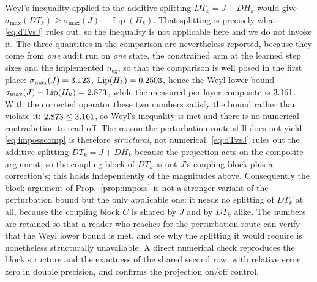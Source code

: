 \documentclass[journal,cmes,article,submit,moreauthors,pdftex]{Definitions/tsp}
\newcommand{\numv}[1]{#1}
\begin{document}
\begin{Remark}\label{rem:weyl}
Weyl's inequality applied to the additive splitting $DT_k=J+DH_k$ would give
$\sigma_{\max}(DT_k)\ge\sigma_{\max}(J)-\operatorname{Lip}(H_k)$. That splitting is precisely what
\eqref{eq:dTvsJ} rules out, so the inequality is not applicable here and we do not invoke it.
The three quantities in the comparison are nevertheless reported, because they come from
\emph{one} audit run on \emph{one} state, the constrained arm at
the learned step sizes and the implemented $n_{\mathrm{cg}}$, so that the comparison is well
posed in the first place:
$\sigma_{\max}(J)=\numv{\NumGdPhysSigma}$,
$\operatorname{Lip}(H_k)=\numv{\NumLipHCons}$, hence the Weyl lower bound
$\sigma_{\max}(J)-\operatorname{Lip}(H_k)=\numv{\NumWeylRhs}$, while the measured per-layer
composite is $\numv{\NumSigCompLayerCons}$. With the corrected operator these two numbers satisfy
the bound rather than violate it: $\numv{\NumWeylRhs}\le\numv{\NumSigCompLayerCons}$, so Weyl's
inequality is met and there is no numerical contradiction to read off. The reason the perturbation
route still does not yield \eqref{eq:imposscomp} is therefore \emph{structural}, not numerical:
\eqref{eq:dTvsJ} rules out the additive splitting $DT_k=J+DH_k$ because the projection acts on the
composite argument, so the coupling block of $DT_k$ is not $J$'s coupling block plus a correction's;
this holds independently of the magnitudes above. Consequently the block argument of
Prop.~\ref{prop:imposs} is not a stronger variant of the perturbation bound but the only
applicable one: it needs no splitting of $DT_k$ at all, because the coupling block $C$ is shared
by $J$ and by $DT_k$ alike. The numbers are retained so that a reader who reaches for the
perturbation route can verify that the Weyl lower bound is met, and see why the splitting it would
require is nonetheless structurally unavailable. A direct numerical check reproduces the block
structure and the exactness of the shared second row, with relative error zero in double precision,
and confirms the projection on/off control.
\end{Remark}
\end{document}
